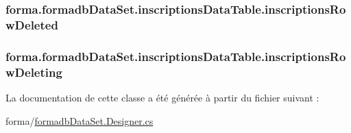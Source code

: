 \subsubsection[{\texorpdfstring{inscriptions\+Row\+Deleted}{inscriptionsRowDeleted}}]{ forma.\+formadb\+Data\+Set.\+inscriptions\+Data\+Table.\+inscriptions\+Row\+Deleted}\hypertarget{classforma_1_1formadb_data_set_1_1inscriptions_data_table_aea6916f9679b0e4570c7239ccead54fb}{}\label{classforma_1_1formadb_data_set_1_1inscriptions_data_table_aea6916f9679b0e4570c7239ccead54fb}
\subsubsection[{\texorpdfstring{inscriptions\+Row\+Deleting}{inscriptionsRowDeleting}}]{ forma.\+formadb\+Data\+Set.\+inscriptions\+Data\+Table.\+inscriptions\+Row\+Deleting}\hypertarget{classforma_1_1formadb_data_set_1_1inscriptions_data_table_afdbbf33b015cc75e3fd772e88dcd0cfa}{}\label{classforma_1_1formadb_data_set_1_1inscriptions_data_table_afdbbf33b015cc75e3fd772e88dcd0cfa}


La documentation de cette classe a été générée à partir du fichier suivant \+:\begin{DoxyCompactItemize}
\item 
forma/\hyperlink{formadb_data_set_8_designer_8cs}{formadb\+Data\+Set.\+Designer.\+cs}\end{DoxyCompactItemize}
